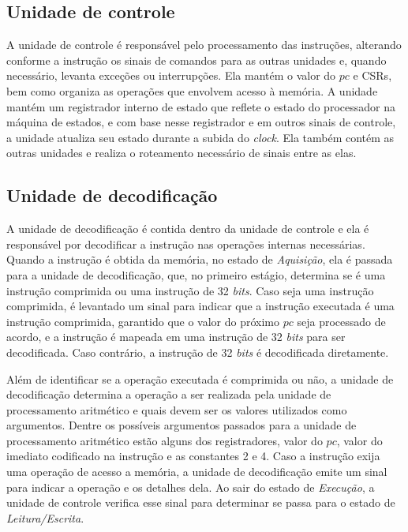 \subsection{Unidade de controle}
\label{ssec:udc}

A unidade de controle é responsável pelo processamento das instruções, alterando conforme a instrução os sinais de comandos
para as outras unidades e, quando necessário, levanta exceções ou interrupções. Ela mantém o valor do $pc$ e CSRs, bem como
organiza as operações que envolvem acesso à memória.
A unidade mantém um registrador interno de estado que reflete o estado do processador na máquina de estados, e com base nesse
registrador e em outros sinais de controle, a unidade atualiza seu estado durante a subida do \emph{clock}. Ela também contém 
as outras unidades e realiza o roteamento necessário de sinais entre as elas.

\subsection{Unidade de decodificação}
\label{ssec:decode}

A unidade de decodificação é contida dentro da unidade de controle e ela é responsável por decodificar a instrução nas
operações internas
necessárias. Quando a instrução é obtida da memória, no estado de \emph{Aquisição}, ela é passada para a unidade de decodificação,
que, no primeiro estágio, determina se é uma instrução comprimida ou uma instrução de 32 \emph{bits}. Caso seja uma instrução
comprimida, é levantado um sinal para indicar que a instrução executada é uma instrução comprimida, garantido que o valor do
próximo $pc$ seja processado de acordo, e a instrução é mapeada em uma instrução de 32 \emph{bits} para ser decodificada.
Caso contrário, a instrução de 32 \emph{bits} é decodificada diretamente.

Além de identificar se a operação executada é comprimida ou não, a unidade de decodificação determina a operação a ser
realizada pela unidade de processamento aritmético e quais devem ser os valores utilizados como argumentos. Dentre os
possíveis argumentos passados para a unidade de processamento aritmético estão alguns dos registradores,
valor do $pc$, valor do imediato codificado na instrução e as constantes 2 e 4.
Caso a instrução exija uma operação de acesso a memória, a unidade de decodificação emite um sinal para indicar a operação 
e os detalhes dela. Ao sair do estado de \emph{Execução}, a unidade de controle verifica esse sinal para determinar
se passa para o estado de \emph{Leitura/Escrita}.

